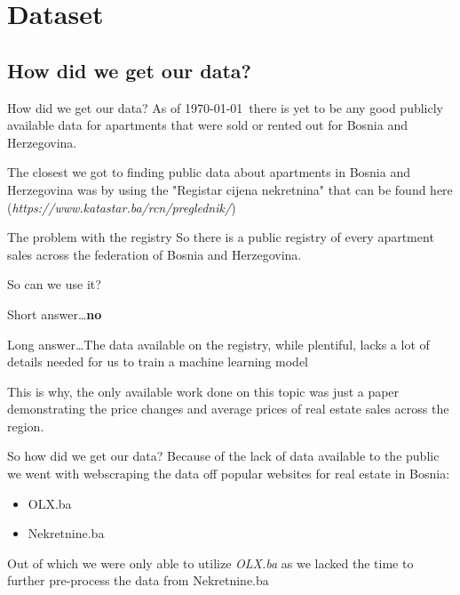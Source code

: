 \documentclass{beamer}
\begin{document}
  \section{Dataset}
    \subsection{How did we get our data?}
      \begin{frame}{How did we get our data?}
        As of \today~there is yet to be any good publicly available data for apartments that were sold or rented out for Bosnia and Herzegovina. \newline \pause

        The closest we got to finding public data about apartments in Bosnia and Herzegovina was by using the "Registar cijena nekretnina" that can be found
        here (\textit{https://www.katastar.ba/rcn/preglednik/})
      \end{frame}

      \begin{frame}{The problem with the registry}
        So there is a public registry of every apartment sales across the federation of Bosnia and Herzegovina. \newline

        So can we use it? \newline \pause

        Short answer\ldots \textbf{no} \newline \pause

        Long answer\ldots The data available on the registry, while plentiful, lacks a lot of details needed for us to train a machine learning model \newline \pause

        This is why, the only available work done on this topic was just a paper demonstrating the price changes and average prices of real estate sales across the region.
      \end{frame}

      \begin{frame}{So how did we get our data?}
        Because of the lack of data available to the public we went with webscraping the data off popular websites for real estate in Bosnia:
        \begin{itemize}
          \item[$\bullet$] OLX.ba
          \item[$\bullet$] Nekretnine.ba
        \end{itemize}

        \vspace{0.5cm}
        \pause
        Out of which we were only able to utilize \emph{OLX.ba} as we lacked the time to further pre-process the data from Nekretnine.ba
      \end{frame}
\end{document}

